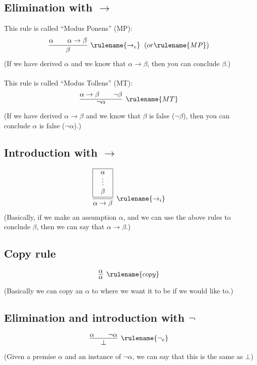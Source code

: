\documentclass{article}
\begin{document}
\subsection{Elimination with $\to$}
    This rule is called ``Modus Ponens'' (MP):
    \begin{align*}
      \infer[\rulename{\to_e} \;\; (or \rulename{MP})]
      {\beta}
      {\alpha && \alpha \to \beta}
    \end{align*}
    (If we have derived $\alpha$ and we know that $\alpha \to \beta$, then you can conclude $\beta$.)
    \\\\This rule is called ``Modus Tollens'' (MT):
    \begin{align*}
      \infer[\rulename{MT}]
      {\neg\alpha}
      {\alpha \to \beta && \neg\beta}
    \end{align*}
    (If we have derived $\alpha \to \beta$ and we know that $\beta$ is false ($\neg\beta$), then you can conclude $\alpha$ is false ($\neg\alpha$).)
    
\subsection{Introduction with $\to$}
    \begin{align*}
      \infer[\rulename{\to_i}]
      {\alpha \to \beta}
      {
        \framebox{\parbox{.8cm}{\centerline{$\alpha$}\centerline{$\vdots$}\centerline{$\beta$}}}
      }
    \end{align*}
    (Basically, if we make an assumption $\alpha$, and we can use the above rules to conclude $\beta$, then we can say that $\alpha\to\beta$.)
    
\subsection{Copy rule}
    \begin{align*}
      \infer[\rulename{copy}]
      {\alpha}
      {\alpha}
    \end{align*}
    (Basically we can copy an $\alpha$ to where we want it to be if we would like to.)

\subsection{Elimination and introduction with $\neg$}
    \begin{align*}
      \infer[\rulename{\neg_e}]
      {\bot}
      {\alpha && \neg \alpha}
    \end{align*}
    (Given a premise $\alpha$ and an instance of $\neg\alpha$, we can say that this is the same as $\bot$)
    
\end{document}
